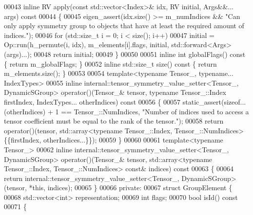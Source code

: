 \begin{DoxyCode}
00043     \textcolor{keyword}{inline} RV apply(\textcolor{keyword}{const} std::vector<Index>& idx, RV initial, Args&&... args)\textcolor{keyword}{ const}
00044 \textcolor{keyword}{    }\{
00045       eigen\_assert(idx.size() >= m\_numIndices && \textcolor{stringliteral}{"Can only apply symmetry group to objects that have at
       least the required amount of indices."});
00046       \textcolor{keywordflow}{for} (std::size\_t i = 0; i < size(); i++)
00047         initial = Op::run(h\_permute(i, idx), m\_elements[i].flags, initial, std::forward<Args>(args)...);
00048       \textcolor{keywordflow}{return} initial;
00049     \}
00050 
00051     \textcolor{keyword}{inline} \textcolor{keywordtype}{int} globalFlags()\textcolor{keyword}{ const }\{ \textcolor{keywordflow}{return} m\_globalFlags; \}
00052     \textcolor{keyword}{inline} std::size\_t size()\textcolor{keyword}{ const }\{ \textcolor{keywordflow}{return} m\_elements.size(); \}
00053 
00054     \textcolor{keyword}{template}<\textcolor{keyword}{typename} Tensor\_, \textcolor{keyword}{typename}... IndexTypes>
00055     \textcolor{keyword}{inline} internal::tensor\_symmetry\_value\_setter<Tensor\_, DynamicSGroup> operator()(Tensor\_& tensor, \textcolor{keyword}{
      typename} Tensor\_::Index firstIndex, IndexTypes... otherIndices)\textcolor{keyword}{ const}
00056 \textcolor{keyword}{    }\{
00057       static\_assert(\textcolor{keyword}{sizeof}...(otherIndices) + 1 == Tensor\_::NumIndices, \textcolor{stringliteral}{"Number of indices used to access a
       tensor coefficient must be equal to the rank of the tensor."});
00058       \textcolor{keywordflow}{return} operator()(tensor, std::array<typename Tensor\_::Index, Tensor\_::NumIndices>\{\{firstIndex, 
      otherIndices...\}\});
00059     \}
00060 
00061     \textcolor{keyword}{template}<\textcolor{keyword}{typename} Tensor\_>
00062     \textcolor{keyword}{inline} internal::tensor\_symmetry\_value\_setter<Tensor\_, DynamicSGroup> operator()(Tensor\_& tensor, 
      std::array<typename Tensor\_::Index, Tensor\_::NumIndices> \textcolor{keyword}{const}& indices)\textcolor{keyword}{ const}
00063 \textcolor{keyword}{    }\{
00064       \textcolor{keywordflow}{return} internal::tensor\_symmetry\_value\_setter<Tensor\_, DynamicSGroup>(tensor, *\textcolor{keyword}{this}, indices);
00065     \}
00066   \textcolor{keyword}{private}:
00067     \textcolor{keyword}{struct }GroupElement \{
00068       std::vector<int> representation;
00069       \textcolor{keywordtype}{int} flags;
00070       \textcolor{keywordtype}{bool} isId()\textcolor{keyword}{ const}
00071 \textcolor{keyword}{      }\{

\end{DoxyCode}

